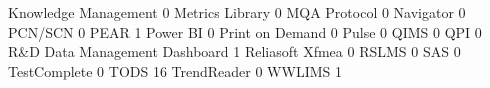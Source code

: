 \documentclass{article}
\begin{document}
\begin{Schunk}
\begin{Soutput}
  Knowledge Management                                                        0
  Metrics Library                                                             0
  MQA Protocol                                                                0
  Navigator                                                                   0
  PCN/SCN                                                                     0
  PEAR                                                                        1
  Power BI                                                                    0
  Print on Demand                                                             0
  Pulse                                                                       0
  QIMS                                                                        0
  QPI                                                                         0
  R&D Data Management Dashboard                                               1
  Reliasoft Xfmea                                                             0
  RSLMS                                                                       0
  SAS                                                                         0
  TestComplete                                                                0
  TODS                                                                       16
  TrendReader                                                                 0
  WWLIMS                                                                      1
                                                           

\end{Soutput}
\end{Schunk}
\end{document}
